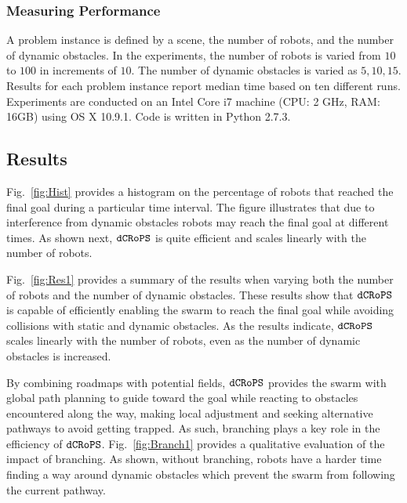 \documentclass[letterpaper, 10pt, conference]{ieeeconf}
\newcommand{\Acronym}[1]{\ensuremath{{\small{\texttt{#1}}}}}
\newcommand{\Name}{\Acronym{dCRoPS}}
\begin{document}
\subsubsection{Measuring Performance}
A problem instance is defined by a scene, the number of robots, and
the number of dynamic obstacles. In the experiments, the number of
robots is varied from $10$ to $100$ in increments of $10$. The number
of dynamic obstacles is varied as $5, 10, 15$. Results for each
problem instance report median time based on ten different runs.
Experiments are conducted on an Intel Core i7 machine (CPU: 2 GHz,
RAM: 16GB) using OS X 10.9.1. Code is written in Python 2.7.3.

\subsection{Results}
\label{sec:Results}

Fig.~\ref{fig:Hist} provides a histogram on the percentage of robots
that reached the final goal during a particular time interval. The
figure illustrates that due to interference from dynamic obstacles
robots may reach the final goal at different times. As shown
next, $\Name$ is quite efficient and scales linearly with the number of
robots.

Fig.~\ref{fig:Res1} provides a summary of the results when varying both
the number of robots and the number of dynamic obstacles.  These results
show that $\Name$ is capable of efficiently enabling the swarm to
reach the final goal while avoiding collisions with static and dynamic
obstacles. As the
results indicate, $\Name$ scales linearly with the number of robots,
even as the number of dynamic obstacles is increased.

By combining roadmaps with potential fields, $\Name$ provides the
swarm with global path planning to guide toward the goal while
reacting to obstacles encountered along the way, making local
adjustment and seeking alternative pathways to avoid getting trapped. 
As such, branching plays a key role in the efficiency of
$\Name$. Fig.~\ref{fig:Branch1} provides a qualitative evaluation of
the impact of branching. As shown, without branching, robots have a
harder time finding a way around dynamic obstacles which prevent the
swarm from following the current pathway.
\end{document}
